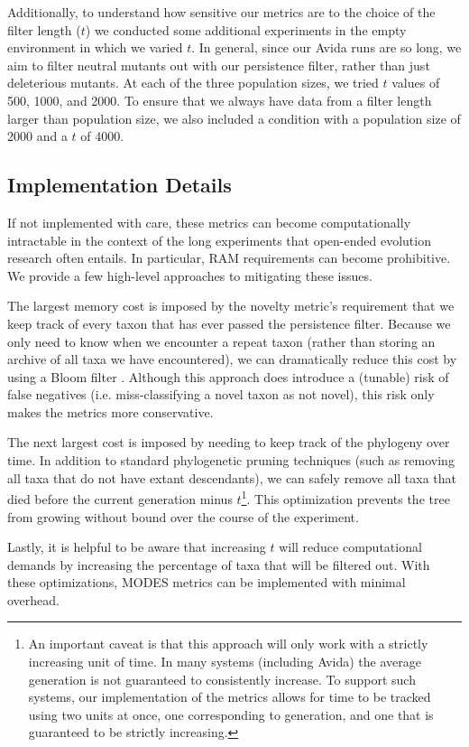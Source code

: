 \documentclass[letterpaper]{article}
\begin{document}
Additionally, to understand how sensitive our metrics are to the choice of the filter length ($t$) we conducted some additional experiments in the empty environment in which we varied $t$. In general, since our Avida runs are so long, we aim to filter neutral mutants out with our persistence filter, rather than just deleterious mutants. At each of the three population sizes, we tried $t$ values of 500, 1000, and 2000. To ensure that we always have data from a filter length larger than population size, we also included a condition with a population size of 2000 and a $t$ of 4000.

\subsection{Implementation Details}
If not implemented with care, these metrics can become computationally intractable in the context of the long experiments that open-ended evolution research often entails. In particular, RAM requirements can become prohibitive. We provide a few high-level approaches to mitigating these issues.

The largest memory cost is imposed by the novelty metric's requirement that we keep track of every taxon that has ever passed the persistence filter. Because we only need to know when we encounter a repeat taxon (rather than storing an archive of all taxa we have encountered), we can dramatically reduce this cost by using a Bloom filter \citep{Bloom:1970:STH:362686.362692}. Although this approach does introduce a (tunable) risk of false negatives (i.e. miss-classifying a novel taxon as not novel), this risk only makes the metrics more conservative. 

The next largest cost is imposed by needing to keep track of the phylogeny over time. In addition to standard phylogenetic pruning techniques (such as removing all taxa that do not have extant descendants), we can safely remove all taxa that died before the current generation minus $t$\footnote{An important caveat is that this approach will only work with a strictly increasing unit of time. In many systems (including Avida) the average generation is not guaranteed to consistently increase. To support such systems, our implementation of the metrics allows for time to be tracked using two units at once, one corresponding to generation, and one that is guaranteed to be strictly increasing.}. This optimization prevents the tree from growing without bound over the course of the experiment.

Lastly, it is helpful to be aware that increasing $t$ will reduce computational demands by increasing the percentage of taxa that will be filtered out. With these optimizations, MODES metrics can be implemented with minimal overhead.
\end{document}
